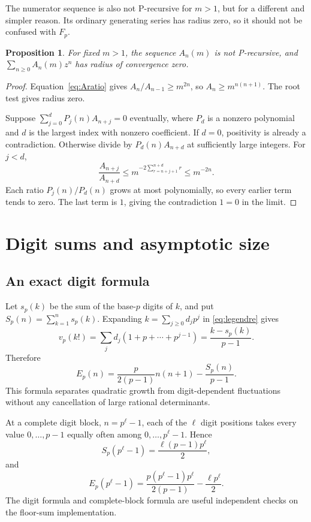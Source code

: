 \documentclass[11pt,a4paper]{article}
\numberwithin{equation}{section}
\newtheorem{proposition}[theorem]{Proposition}
\theoremstyle{definition}
\theoremstyle{remark}
\begin{document}
The numerator sequence is also not P-recursive for $m>1$, but for a different and simpler reason. Its ordinary generating series has radius zero, so it should not be confused with $F_p$.

\begin{proposition}\label{prop:Anonrec}
For fixed $m>1$, the sequence $A_n(m)$ is not P-recursive, and $\sum_{n\geq0}A_n(m)z^n$ has radius of convergence zero.
\end{proposition}
\begin{proof}
Equation~\eqref{eq:Aratio} gives $A_n/A_{n-1}\geq m^{2n}$, so $A_n\geq m^{n(n+1)}$. The root test gives radius zero.

Suppose $\sum_{j=0}^dP_j(n)A_{n+j}=0$ eventually, where $P_d$ is a nonzero polynomial and $d$ is the largest index with nonzero coefficient. If $d=0$, positivity is already a contradiction. Otherwise divide by $P_d(n)A_{n+d}$ at sufficiently large integers. For $j<d$,
\[
 \frac{A_{n+j}}{A_{n+d}}
 \leq m^{-2\sum_{r=n+j+1}^{n+d}r}
 \leq m^{-2n}.
\]
Each ratio $P_j(n)/P_d(n)$ grows at most polynomially, so every earlier term tends to zero. The last term is $1$, giving the contradiction $1=0$ in the limit.
\end{proof}

\section{Digit sums and asymptotic size}\label{sec:asymptotics}

\subsection{An exact digit formula}
Let $s_p(k)$ be the sum of the base-$p$ digits of $k$, and put
$S_p(n)=\sum_{k=1}^n s_p(k)$. Expanding $k=\sum_{j\geq0}d_jp^j$ in \eqref{eq:legendre} gives
\[
 v_p(k!)=\sum_jd_j(1+p+\cdots+p^{j-1})
 =\frac{k-s_p(k)}{p-1}.
\]
Therefore
\begin{equation}\label{eq:digitE}
 E_p(n)=\frac{p}{2(p-1)}n(n+1)-\frac{S_p(n)}{p-1}.
\end{equation}
This formula separates quadratic growth from digit-dependent fluctuations without any cancellation of large rational determinants.

At a complete digit block, $n=p^\ell-1$, each of the $\ell$ digit positions takes every value $0,\ldots,p-1$ equally often among $0,\ldots,p^\ell-1$. Hence
\[
 S_p(p^\ell-1)=\frac{\ell(p-1)p^\ell}{2},
\]
and
\begin{equation}\label{eq:completeblock}
 E_p(p^\ell-1)=
 \frac{p(p^\ell-1)p^\ell}{2(p-1)}-\frac{\ell p^\ell}{2}.
\end{equation}
The digit formula and complete-block formula are useful independent checks on the floor-sum implementation.
\end{document}
